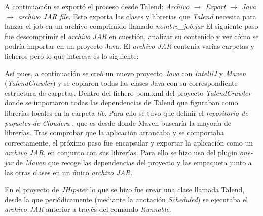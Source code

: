 A continuación se exportó el proceso desde Talend: 
\textit{Archivo $\rightarrow$ Export $\rightarrow$ Java $\rightarrow$ archivo JAR file}. Esto exporta las clases y librerias que \textit{Talend} necesita para lanzar el job en un archivo comprimido llamado \textit{nombre\_job.jar}
El siguiente paso fue descomprimir el \textit{archivo JAR} en cuestión, analizar su contenido y ver cómo se podría importar en un proyecto Java. El \textit{archivo JAR} contenía varias carpetas y ficheros pero lo que interesa es lo siguiente:
\bigskip
\par 
{}
\bigskip
\par
Así pues, a continuación se creó un nuevo proyecto \textit{Java} con \textit{IntelliJ} y \textit{Maven} (\textit{TalendCrawler}) y se copiaron todas las clases Java con su correspondiente estructura de carpetas. Dentro del fichero pom.xml del proyecto \textit{TalendCrawler} donde se importaron todas las dependencias de Talend que figuraban como librerías locales en la carpeta \textit{lib}. Para ello se tuvo que definir el \textit{repositorio de paquetes de Cloudera} \cite{cloudera}, que es desde donde Maven buscaría la mayoría de librerías. Tras comprobar que la aplicación arrancaba y se comportaba correctamente, el próximo paso fue encapsular y exportar la aplicación como un \textit{archivo JAR}, en conjunto con sus librerías. Para ello se hizo uso del plugin \textit{one-jar} de \textit{Maven} que recoge las dependencias del proyecto y las empaqueta junto a las otras clases en un único \textit{archivo JAR}.\par 

En el proyecto de \textit{JHipster} lo que se hizo fue crear una clase llamada Talend, desde la que periódicamente (mediante la anotación \textit{Scheduled}) se ejecutaba el \textit{archivo JAR} anterior a través del comando \textit{Runnable}. 

